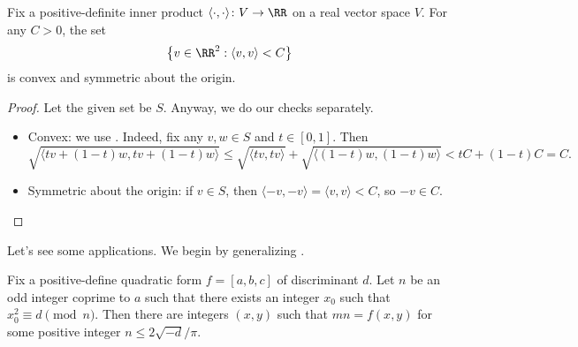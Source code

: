 \documentclass[../notes.tex]{subfiles}
\begin{document}
\begin{corollary} \label{cor:inner-prod-circle}
	Fix a positive-definite inner product $\langle\cdot,\cdot\rangle\colon V\to\RR$ on a real vector space $V$. For any $C>0$, the set
	\[\left\{v\in\RR^2:\langle v,v\rangle<C\right\}\]
	is convex and symmetric about the origin.
\end{corollary}
\begin{proof}
	Let the given set be $S$. Anyway, we do our checks separately.
	\begin{itemize}
		\item Convex: we use . Indeed, fix any $v,w\in S$ and $t\in[0,1]$. Then
		\[\sqrt{\langle tv+(1-t)w,tv+(1-t)w\rangle}\le\sqrt{\langle tv,tv\rangle}+\sqrt{\langle(1-t)w,(1-t)w\rangle}<tC+(1-t)C=C.\]
		\item Symmetric about the origin: if $v\in S$, then $\langle-v,-v\rangle=\langle v,v\rangle<C$, so $-v\in C$.
		\qedhere
	\end{itemize}
\end{proof}
Let's see some applications. We begin by generalizing .
\begin{proposition} \label{prop:almost-primes-of-the-form}
	Fix a positive-define quadratic form $f=[a,b,c]$ of discriminant $d$. Let $n$ be an odd integer coprime to $a$ such that there exists an integer $x_0$ such that $x_0^2\equiv d\pmod n$. Then there are integers $(x,y)$ such that $mn=f(x,y)$ for some positive integer $n\le2\sqrt{-d}/\pi$.
\end{proposition}
\end{document}
